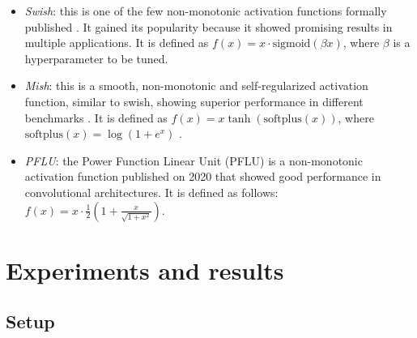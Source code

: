 \begin{itemize}
	\item \textit{Swish}: this is one of the few non-monotonic activation functions formally published \cite{ramachandran2018}. It gained its popularity because it showed promising results in multiple applications. It is defined as $f(x) = x \cdot \text{sigmoid}(\beta x)$, where $\beta$ is a hyperparameter to be tuned.
	\item \textit{Mish}: this is a smooth, non-monotonic and self-regularized activation function, similar to swish, showing superior performance in different benchmarks \cite{misra2019mish}. It is defined as $f(x) = x \tanh (\text{softplus} (x))$, where $\text{softplus} (x) = \log(1+e^x)$ \cite{dugas2001}.
	\item \textit{PFLU}: the Power Function Linear Unit (PFLU) is a non-monotonic activation function published on 2020 that showed good performance in convolutional architectures. It is defined as follows: $f(x) = x \cdot \frac{1}{2} \left( 1 + \frac{x}{\sqrt{1+x^2}} \right)$.
	
\end{itemize}

\section{Experiments and results} \label{sec:experiments}
\subsection{Setup}

